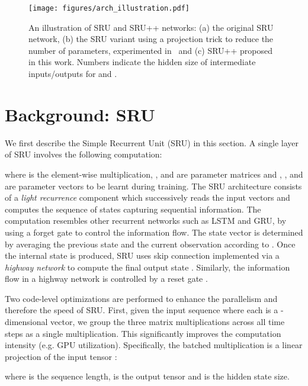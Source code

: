 \documentclass[11pt,a4paper]{article}
\begin{document}
 
\begin{figure*}[!t]
\centering
\texttt{[image: figures/arch\_illustration.pdf]}
\caption{An illustration of SRU and SRU++ networks: (a) the original SRU network, (b) the SRU variant using a projection trick to reduce the number of parameters, experimented in~\citet{lei2018sru} and (c) SRU++ proposed in this work. Numbers indicate the hidden size of intermediate inputs/outputs for  and .}
\label{fig:arch}
\end{figure*}

\section{Background: SRU}
\label{sec:sru}
We first describe the Simple Recurrent Unit (SRU) in this section. 
A single layer of SRU involves the following computation:

where  is the element-wise multiplication, ,  and  are parameter matrices and , ,  and  are parameter vectors to be learnt during training.
The SRU architecture consists of a \emph{light recurrence} component 
which successively reads the input vectors  and computes the sequence of states  capturing sequential information.
The computation resembles other recurrent networks such as LSTM and GRU, by using a forget gate  to control the information flow.
The state vector  is determined by averaging the previous state  and the current observation  according to .
Once the internal state  is produced, SRU uses skip connection implemented via a \emph{highway network} to compute the final output state .
Similarly, the information flow in a highway network is controlled by a reset gate .











Two code-level optimizations are performed to enhance the parallelism and therefore the speed of SRU.
First, given the input sequence  where each  is a -dimensional vector, we group the three matrix multiplications across all time steps as a single multiplication.
This significantly improves the computation intensity (e.g. GPU utilization).
Specifically, the batched multiplication is a linear projection of the input tensor :

where  is the sequence length,  is the output tensor and  is the hidden state size.
\end{document}
